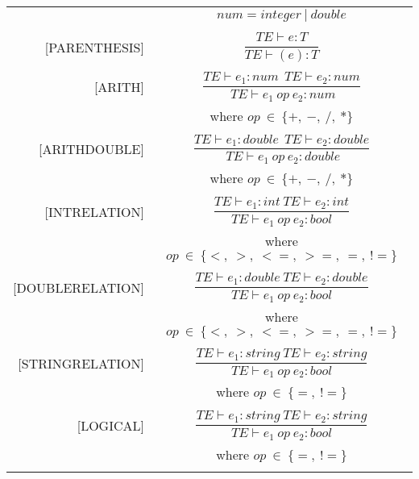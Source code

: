 \begin{longtable}[c] { r c }
  \centering

  & \(num = integer \ | \ double\) \\
  & \\

  [PARENTHESIS] & \(
    \dfrac{T E  \vdash  e  :  T}{T E  \vdash  (e)  :  T} \) \\
  & \\

  [ARITH] &  \(
  \dfrac{TE \vdash e_{1} :  num \ \ TE \vdash e_{2} : num} 
  {\ TE \vdash e_{1} \ op \ e_{2} : num} \) \\
  & where \( op \ \in \ \{+, \ -, \ /, \ *\} \) \\
  & \\

  [ARITHDOUBLE] &  \(
  \dfrac{TE \vdash e_{1} : double \ \ TE \vdash e_{2} :  double} 
  {\ TE \vdash e_{1} \ op \ e_{2} : double} \) \\
  & where \( op \ \in \ \{+, \ -, \ /, \ *\} \) \\
  & \\

  [INTRELATION] &  \(
  \dfrac{T E  \vdash  e_1  :  int \ T E  \vdash  e_2  :  int}{T E  \vdash  e_1 \ op \ e_2  :  bool} \) \\
  & where \( op \ \in \ \{<,\ >,\ < =,\ >=,\ =,\ !=\} \) \\
  & \\

  [DOUBLERELATION] &  \(
  \dfrac{T E  \vdash  e_1  : double \ T E  \vdash  e_2  :  double}{T E  \vdash  e_1 \ op \ e_2  :  bool} \) \\
  &  where \( op \ \in \ \{<,\ >,\ < =,\ >=,\ =,\ !=\} \) \\
  & \\

  [STRINGRELATION] &  \(
  \dfrac{T E  \vdash  e_1  :  string \ TE  \vdash  e_2  :  string }{TE  \vdash  e_1 \ op \ e_2  :  bool} \) \\
  & where \( op \ \in \ \{=, \ !=\} \) \\
  & \\

  [LOGICAL] &  \(
  \dfrac{T E  \vdash  e_1  :  string \ TE  \vdash  e_2  :  string }{T E  \vdash  e_1 \ op \ e_2  :  bool} \) \\
  & where \( op \ \in \ \{=,\ !=\} \) \\
  & \\


\end{longtable}
